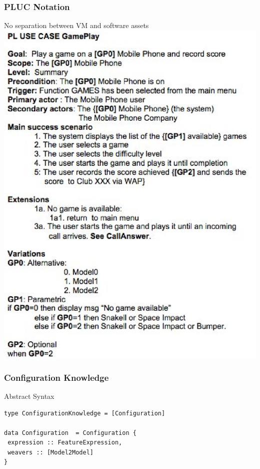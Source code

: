 \documentclass[xcolor=svgnames]{beamer}
\begin{document}
\begin{frame}
\frametitle{PLUC Notation}
\begin{block}{No separation between VM and software assets}
\includegraphics[scale=0.4]{img/pluc.eps}
\end{block}
\end{frame}

\begin{frame}[fragile,label=ck]
\frametitle{Configuration Knowledge}
\begin{block}{Abstract Syntax}
\begin{center}
\begin{tiny}
\begin{lstlisting}[frame=tb]
type ConfigurationKnowledge = [Configuration]
 
data Configuration  = Configuration {
 expression :: FeatureExpression,
 weavers :: [Model2Model] 	 
}
\end{lstlisting}
\end{tiny}
\end{center}
\end{block}
\end{frame}
\end{document}
